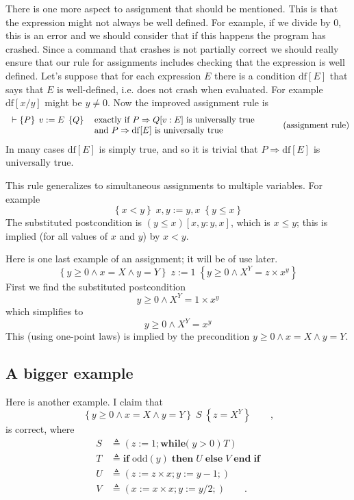 \documentclass[muchmore,11pt]{article}%
\begin{document}
There is one more aspect to assignment that should be mentioned. This is that
the expression might not always be well defined. For example, if we divide by
$0$, this is an error and we should consider that if this happens the program
has crashed. Since a command that crashes is not partially correct we should
really ensure that our rule for assignments includes checking that the
expression is well defined. Let's suppose that for each expression $E$ there
is a condition $\mathrm{df}[E]$ that says that $E$ is well-defined, i.e. does
not crash when evaluated. For example $\mathrm{df}[x/y]$ might be $y\neq0$.
Now the improved assignment rule is
\begin{equation}%
\begin{tabular}
[c]{ll}%
$\vdash\left\{  P\right\}  \;v:=E\;\left\{  Q\right\}  $ & $\text{exactly if
}P\Rightarrow Q[v:E]\text{ is universally true}$\\
& $\text{and }P\Rightarrow\mathrm{df}[E]\text{ is universally true}$%
\end{tabular}
\ \text{ }\tag{assignment rule}%
\end{equation}
In many cases $\mathrm{df}[E]$ is simply $\mathrm{true}$, and so it is trivial
that $P\Rightarrow\mathrm{df}[E]$ is universally true.

This rule generalizes to simultaneous assignments to multiple variables. For
example%
\[
\left\{  x<y\right\}  \;x,y:=y,x\;\left\{  y\leq x\right\}
\]
The substituted postcondition is $\left(  y\leq x\right)  [x,y:y,x]$, which is
$x\leq y$; this is implied (for all values of $x$ and $y$) by $x<y$.

Here is one last example of an assignment; it will be of use later.%
\[
\left\{  y\geq0\wedge x=X\wedge y=Y\right\}  \;z:=1\;\left\{  y\geq0\wedge
X^{Y}=z\times x^{y}\right\}
\]
First we find the substituted postcondition%
\[
y\geq0\wedge X^{Y}=1\times x^{y}%
\]
which simplifies to
\[
y\geq0\wedge X^{Y}=x^{y}%
\]
This (using one-point laws) is implied by the precondition $y\geq0\wedge
x=X\wedge y=Y$.

\subsection{A bigger example}

Here is another example. I claim that
\begin{equation}
\left\{  y\geq0\wedge x=X\wedge y=Y\right\}  \;S\;\left\{  z=X^{Y}\right\}
\qquad\text{,} \label{a}%
\end{equation}
is correct, where
\begin{align*}
S  &  \triangleq\left(  z:=1;\mathbf{while(}\;y>0\;)\;T\right) \\
T  &  \triangleq\mathbf{if}\;\mathit{\mathrm{odd}}(y)\;\mathbf{then}%
\;U\;\mathbf{else}\;V\;\mathbf{end\;if}\\
U  &  \triangleq(z:=z\times x;y:=y-1;)\\
V  &  \triangleq(x:=x\times x;y:=y/2;)\qquad\text{.}%
\end{align*}
\end{document}
